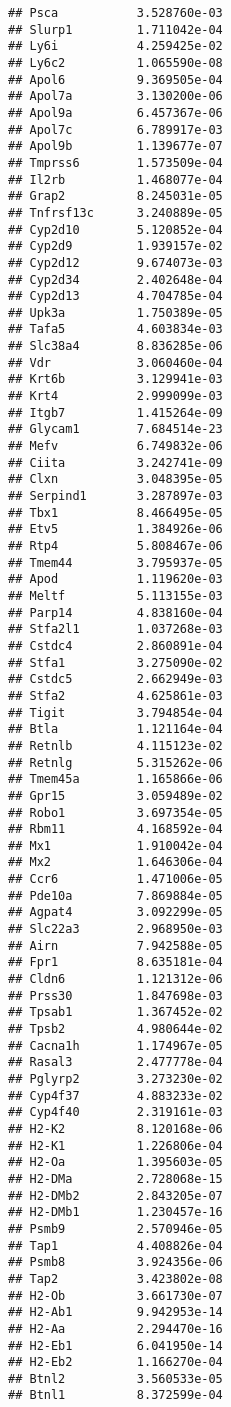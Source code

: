 \documentclass[
]{article}
\begin{document}
\begin{verbatim}
## Psca           3.528760e-03
## Slurp1         1.711042e-04
## Ly6i           4.259425e-02
## Ly6c2          1.065590e-08
## Apol6          9.369505e-04
## Apol7a         3.130200e-06
## Apol9a         6.457367e-06
## Apol7c         6.789917e-03
## Apol9b         1.139677e-07
## Tmprss6        1.573509e-04
## Il2rb          1.468077e-04
## Grap2          8.245031e-05
## Tnfrsf13c      3.240889e-05
## Cyp2d10        5.120852e-04
## Cyp2d9         1.939157e-02
## Cyp2d12        9.674073e-03
## Cyp2d34        2.402648e-04
## Cyp2d13        4.704785e-04
## Upk3a          1.750389e-05
## Tafa5          4.603834e-03
## Slc38a4        8.836285e-06
## Vdr            3.060460e-04
## Krt6b          3.129941e-03
## Krt4           2.999099e-03
## Itgb7          1.415264e-09
## Glycam1        7.684514e-23
## Mefv           6.749832e-06
## Ciita          3.242741e-09
## Clxn           3.048395e-05
## Serpind1       3.287897e-03
## Tbx1           8.466495e-05
## Etv5           1.384926e-06
## Rtp4           5.808467e-06
## Tmem44         3.795937e-05
## Apod           1.119620e-03
## Meltf          5.113155e-03
## Parp14         4.838160e-04
## Stfa2l1        1.037268e-03
## Cstdc4         2.860891e-04
## Stfa1          3.275090e-02
## Cstdc5         2.662949e-03
## Stfa2          4.625861e-03
## Tigit          3.794854e-04
## Btla           1.121164e-04
## Retnlb         4.115123e-02
## Retnlg         5.315262e-06
## Tmem45a        1.165866e-06
## Gpr15          3.059489e-02
## Robo1          3.697354e-05
## Rbm11          4.168592e-04
## Mx1            1.910042e-04
## Mx2            1.646306e-04
## Ccr6           1.471006e-05
## Pde10a         7.869884e-05
## Agpat4         3.092299e-05
## Slc22a3        2.968950e-03
## Airn           7.942588e-05
## Fpr1           8.635181e-04
## Cldn6          1.121312e-06
## Prss30         1.847698e-03
## Tpsab1         1.367452e-02
## Tpsb2          4.980644e-02
## Cacna1h        1.174967e-05
## Rasal3         2.477778e-04
## Pglyrp2        3.273230e-02
## Cyp4f37        4.883233e-02
## Cyp4f40        2.319161e-03
## H2-K2          8.120168e-06
## H2-K1          1.226806e-04
## H2-Oa          1.395603e-05
## H2-DMa         2.728068e-15
## H2-DMb2        2.843205e-07
## H2-DMb1        1.230457e-16
## Psmb9          2.570946e-05
## Tap1           4.408826e-04
## Psmb8          3.924356e-06
## Tap2           3.423802e-08
## H2-Ob          3.661730e-07
## H2-Ab1         9.942953e-14
## H2-Aa          2.294470e-16
## H2-Eb1         6.041950e-14
## H2-Eb2         1.166270e-04
## Btnl2          3.560533e-05
## Btnl1          8.372599e-04

\end{verbatim}
\end{document}
